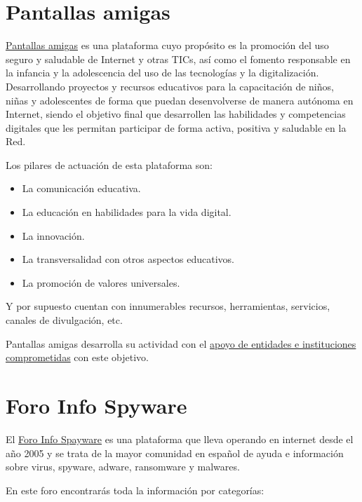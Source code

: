 \documentclass[
  a4paper,
  openany]{book}
\begin{document}
\hypertarget{pantallas-amigas}{%
\section{Pantallas amigas}\label{pantallas-amigas}}

\href{https://www.pantallasamigas.net/}{Pantallas amigas} es una plataforma cuyo propósito es la promoción del uso seguro y saludable de Internet y otras TICs, así como el fomento responsable en la infancia y la adolescencia del uso de las tecnologías y la digitalización. Desarrollando proyectos y recursos educativos para la capacitación de niños, niñas y adolescentes de forma que puedan desenvolverse de manera autónoma en Internet, siendo el objetivo final que desarrollen las habilidades y competencias digitales que les permitan participar de forma activa, positiva y saludable en la Red.

Los pilares de actuación de esta plataforma son:

\begin{itemize}
\item
  La comunicación educativa.
\item
  La educación en habilidades para la vida digital.
\item
  La innovación.
\item
  La transversalidad con otros aspectos educativos.
\item
  La promoción de valores universales.
\end{itemize}

Y por supuesto cuentan con innumerables recursos, herramientas, servicios, canales de divulgación, etc.

Pantallas amigas desarrolla su actividad con el \href{https://www.pantallasamigas.net/confian-en-pantallasamigas/}{apoyo de entidades e instituciones comprometidas} con este objetivo.

\hypertarget{foro-info-spyware}{%
\section{Foro Info Spyware}\label{foro-info-spyware}}

El \href{https://forospyware.com/}{Foro Info Spayware} es una plataforma que lleva operando en internet desde el año 2005 y se trata de la mayor comunidad en español de ayuda e información sobre virus, spyware, adware, ransomware y malwares.

En este foro encontrarás toda la información por categorías:
\end{document}
